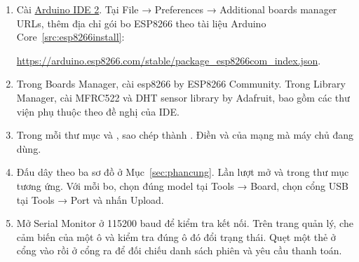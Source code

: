 \begin{enumerate}
\item Cài \href{https://www.arduino.cc/en/software}{Arduino IDE 2}. Tại File → Preferences → Additional boards manager URLs, thêm địa chỉ gói bo ESP8266 theo tài liệu Arduino Core~\ref{src:esp8266install}:\par
\url{https://arduino.esp8266.com/stable/package_esp8266com_index.json}.
\item Trong Boards Manager, cài esp8266 by ESP8266 Community. Trong Library Manager, cài MFRC522 và DHT sensor library by Adafruit, bao gồm các thư viện phụ thuộc theo đề nghị của IDE.
\item Trong mỗi thư mục  và , sao chép  thành . Điền  và  của mạng mà máy chủ đang dùng.
\item Đấu dây theo ba sơ đồ ở Mục~\ref{sec:phancung}. Lần lượt mở  và  trong thư mục tương ứng. Với mỗi bo, chọn đúng model tại Tools → Board, chọn cổng USB tại Tools → Port và nhấn Upload.
\item Mở Serial Monitor ở 115200 baud để kiểm tra kết nối. Trên trang quản lý, che cảm biến của một ô và kiểm tra đúng ô đó đổi trạng thái. Quẹt một thẻ ở cổng vào rồi ở cổng ra để đối chiếu danh sách phiên và yêu cầu thanh toán.
\end{enumerate}
